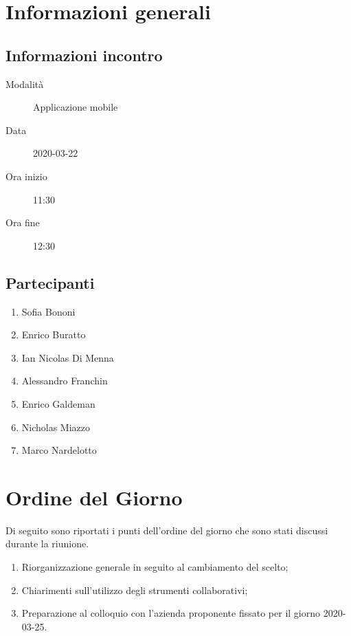 \documentclass{article}
\begin{document}


\section{Informazioni generali}%
\label{sec:informazioni_generali}

\subsection{Informazioni incontro}%
\label{sub:informazioni_incontro}

\begin{description}
  \item[Modalità] Applicazione mobile 
  \item[Data] 2020-03-22
  \item[Ora inizio] 11:30
  \item[Ora fine] 12:30
\end{description}

\subsection{Partecipanti}%
\label{sub:partecipanti}

\begin{enumerate}
  \item Sofia Bononi
  \item Enrico Buratto
  \item Ian Nicolas Di Menna
  \item Alessandro Franchin
  \item Enrico Galdeman
  \item Nicholas Miazzo
  \item Marco Nardelotto
\end{enumerate}

\section{Ordine del Giorno}%
\label{ordine_del_giorno}
Di seguito sono riportati i punti dell'ordine del giorno che sono stati discussi durante la riunione.
\begin{enumerate}
  \item Riorganizzazione generale in seguito al cambiamento del  scelto;
  \item Chiarimenti sull'utilizzo degli strumenti collaborativi;
  \item Preparazione al colloquio con l'azienda proponente fissato per il giorno 2020-03-25.
\end{enumerate}
\end{document}

